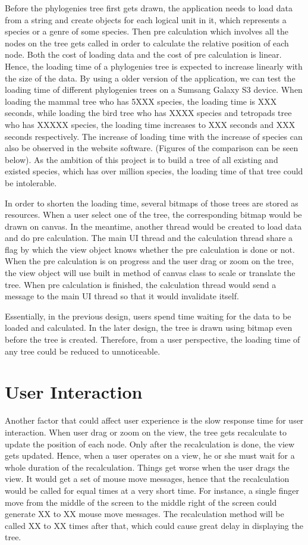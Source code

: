 \documentclass[MSc]{icldt}
\begin{document}
Before the phylogenies tree first gets drawn, the application needs to load data from a string and create objects for each logical unit in it, which represents a species or a genre of some species. Then pre calculation which involves all the nodes on the tree gets called in order to calculate the relative position of each node. Both the cost of loading data and the cost of pre calculation is linear. Hence, the loading time of a phylogenies tree is expected to increase linearly with the size of the data. By using a older version of the application, we can test the loading time of different phylogenies trees on a Sumsang Galaxy S3 device. When loading the mammal tree who has 5XXX species, the loading time is XXX seconds, while loading the bird tree who has XXXX species and tetropads tree who has XXXXX species, the loading time increases to XXX seconds and XXX seconds respectively. The increase of loading time with the increase of species can also be observed in the website software. (Figures of the comparison can be seen below). As the ambition of this project is to build a tree of all existing and existed species, which has over million species, the loading time of that tree could be intolerable.

In order to shorten the loading time, several bitmaps of those trees are stored as resources. When a user select one of the tree, the corresponding bitmap would be drawn on canvas. In the meantime, another thread would be created to load data and do pre calculation. The main UI thread and the calculation thread share a flag by which the view object knows whether the pre calculation is done or not. When the pre calculation is on progress and the user drag or zoom on the tree, the view object will use built in method of canvas class to scale or translate the tree. When pre calculation is finished, the calculation thread would send a message to the main UI thread so that it would invalidate itself. 

Essentially, in the previous design, users spend time waiting for the data to be loaded and calculated. In the later design, the tree is drawn using bitmap even before the tree is created. Therefore, from a user perspective, the loading time of any tree could be reduced to unnoticeable. 

\section{User Interaction}

Another factor that could affect user experience is the slow response time for user interaction. When user drag or zoom on the view, the tree gets recalculate to update the position of each node. Only after the recalculation is done, the view gets updated. Hence, when a user operates on a view, he or she must wait for a whole duration of the recalculation. Things get worse when the user drags the view. It would get a set of mouse move messages, hence that the recalculation would be called for equal times at a very short time. For instance, a single finger move from the middle of the screen to the middle right of the screen could generate XX to XX mouse move messages. The recalculation method will be called XX to XX times after that, which could cause great delay in displaying the tree.
\end{document}

